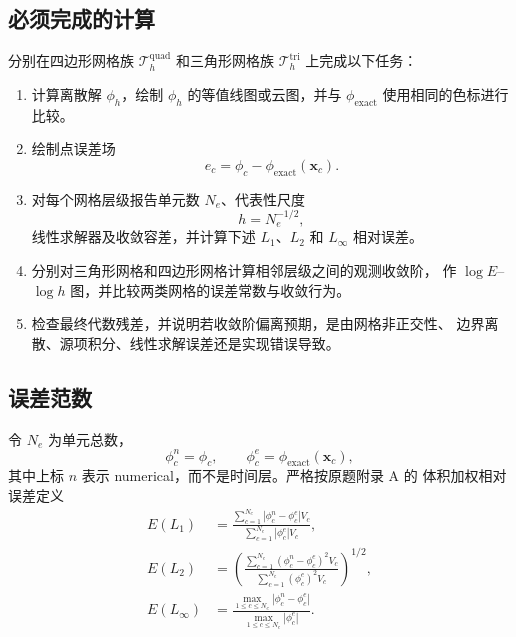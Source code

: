 \documentclass[11pt,a4paper]{ctexart}
\newcommand{\T}{\mathcal{T}}
\begin{document}
\subsection{必须完成的计算}

分别在四边形网格族 $\T_h^{\mathrm{quad}}$ 和三角形网格族
$\T_h^{\mathrm{tri}}$ 上完成以下任务：

\begin{enumerate}[label=\arabic*.]
  \item 计算离散解 $\phi_h$，绘制 $\phi_h$ 的等值线图或云图，并与
  $\phi_{\mathrm{exact}}$ 使用相同的色标进行比较。

  \item 绘制点误差场
  \begin{equation}
    e_c=\phi_c-\phi_{\mathrm{exact}}(\mathbf x_c).
  \end{equation}

  \item 对每个网格层级报告单元数 $N_e$、代表性尺度
  \begin{equation}
    h=N_e^{-1/2},
    \label{eq:effective-h}
  \end{equation}
  线性求解器及收敛容差，并计算下述 $L_1$、$L_2$ 和 $L_\infty$
  相对误差。

  \item 分别对三角形网格和四边形网格计算相邻层级之间的观测收敛阶，
  作 $\log E$--$\log h$ 图，并比较两类网格的误差常数与收敛行为。

  \item 检查最终代数残差，并说明若收敛阶偏离预期，是由网格非正交性、
  边界离散、源项积分、线性求解误差还是实现错误导致。
\end{enumerate}

\subsection{误差范数}

令 $N_e$ 为单元总数，
\begin{equation}
  \phi_c^{n}=\phi_c,
  \qquad
  \phi_c^{e}=\phi_{\mathrm{exact}}(\mathbf x_c),
\end{equation}
其中上标 $n$ 表示 numerical，而不是时间层。严格按原题附录 A 的
体积加权相对误差定义
\begin{align}
  E(L_1)
  &=\frac{\displaystyle\sum_{c=1}^{N_e}
  |\phi_c^{n}-\phi_c^{e}|V_c}
  {\displaystyle\sum_{c=1}^{N_e}|\phi_c^{e}|V_c},
  \label{eq:L1}\\[0.5em]
  E(L_2)
  &=\left(
  \frac{\displaystyle\sum_{c=1}^{N_e}
  (\phi_c^{n}-\phi_c^{e})^2V_c}
  {\displaystyle\sum_{c=1}^{N_e}(\phi_c^{e})^2V_c}
  \right)^{1/2},
  \label{eq:L2}\\[0.5em]
  E(L_\infty)
  &=\frac{\displaystyle\max_{1\le c\le N_e}
  |\phi_c^{n}-\phi_c^{e}|}
  {\displaystyle\max_{1\le c\le N_e}|\phi_c^{e}|}.
  \label{eq:Linf}
\end{align}
\end{document}
